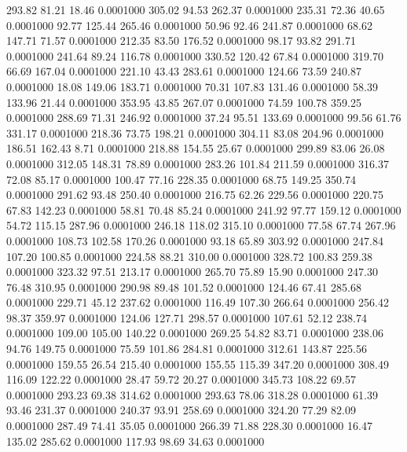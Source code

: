  293.82   81.21   18.46   0.0001000
 305.02   94.53  262.37   0.0001000
 235.31   72.36   40.65   0.0001000
  92.77  125.44  265.46   0.0001000
  50.96   92.46  241.87   0.0001000
  68.62  147.71   71.57   0.0001000
 212.35   83.50  176.52   0.0001000
  98.17   93.82  291.71   0.0001000
 241.64   89.24  116.78   0.0001000
 330.52  120.42   67.84   0.0001000
 319.70   66.69  167.04   0.0001000
 221.10   43.43  283.61   0.0001000
 124.66   73.59  240.87   0.0001000
  18.08  149.06  183.71   0.0001000
  70.31  107.83  131.46   0.0001000
  58.39  133.96   21.44   0.0001000
 353.95   43.85  267.07   0.0001000
  74.59  100.78  359.25   0.0001000
 288.69   71.31  246.92   0.0001000
  37.24   95.51  133.69   0.0001000
  99.56   61.76  331.17   0.0001000
 218.36   73.75  198.21   0.0001000
 304.11   83.08  204.96   0.0001000
 186.51  162.43    8.71   0.0001000
 218.88  154.55   25.67   0.0001000
 299.89   83.06   26.08   0.0001000
 312.05  148.31   78.89   0.0001000
 283.26  101.84  211.59   0.0001000
 316.37   72.08   85.17   0.0001000
 100.47   77.16  228.35   0.0001000
  68.75  149.25  350.74   0.0001000
 291.62   93.48  250.40   0.0001000
 216.75   62.26  229.56   0.0001000
 220.75   67.83  142.23   0.0001000
  58.81   70.48   85.24   0.0001000
 241.92   97.77  159.12   0.0001000
  54.72  115.15  287.96   0.0001000
 246.18  118.02  315.10   0.0001000
  77.58   67.74  267.96   0.0001000
 108.73  102.58  170.26   0.0001000
  93.18   65.89  303.92   0.0001000
 247.84  107.20  100.85   0.0001000
 224.58   88.21  310.00   0.0001000
 328.72  100.83  259.38   0.0001000
 323.32   97.51  213.17   0.0001000
 265.70   75.89   15.90   0.0001000
 247.30   76.48  310.95   0.0001000
 290.98   89.48  101.52   0.0001000
 124.46   67.41  285.68   0.0001000
 229.71   45.12  237.62   0.0001000
 116.49  107.30  266.64   0.0001000
 256.42   98.37  359.97   0.0001000
 124.06  127.71  298.57   0.0001000
 107.61   52.12  238.74   0.0001000
 109.00  105.00  140.22   0.0001000
 269.25   54.82   83.71   0.0001000
 238.06   94.76  149.75   0.0001000
  75.59  101.86  284.81   0.0001000
 312.61  143.87  225.56   0.0001000
 159.55   26.54  215.40   0.0001000
 155.55  115.39  347.20   0.0001000
 308.49  116.09  122.22   0.0001000
  28.47   59.72   20.27   0.0001000
 345.73  108.22   69.57   0.0001000
 293.23   69.38  314.62   0.0001000
 293.63   78.06  318.28   0.0001000
  61.39   93.46  231.37   0.0001000
 240.37   93.91  258.69   0.0001000
 324.20   77.29   82.09   0.0001000
 287.49   74.41   35.05   0.0001000
 266.39   71.88  228.30   0.0001000
  16.47  135.02  285.62   0.0001000
 117.93   98.69   34.63   0.0001000
